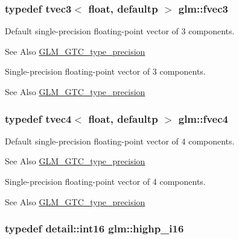 \hypertarget{group__gtc__type__precision_ga8480fdaa7fb8e177e57b367be79863d8}{
\subsubsection[{fvec3}]{\setlength{\rightskip}{0pt plus 5cm}typedef tvec3$<$ float, defaultp $>$ {\bf glm\-::fvec3}}}\label{group__gtc__type__precision_ga8480fdaa7fb8e177e57b367be79863d8}
Default single-\/precision floating-\/point vector of 3 components. \begin{DoxySeeAlso}{See Also}
\hyperlink{group__gtc__type__precision}{G\-L\-M\-\_\-\-G\-T\-C\-\_\-type\-\_\-precision}
\end{DoxySeeAlso}
Single-\/precision floating-\/point vector of 3 components. \begin{DoxySeeAlso}{See Also}
\hyperlink{group__gtc__type__precision}{G\-L\-M\-\_\-\-G\-T\-C\-\_\-type\-\_\-precision} 
\end{DoxySeeAlso}
\hypertarget{group__gtc__type__precision_ga396c4084cd7e5465f8b56035e0420c3e}{
\subsubsection[{fvec4}]{\setlength{\rightskip}{0pt plus 5cm}typedef tvec4$<$ float, defaultp $>$ {\bf glm\-::fvec4}}}\label{group__gtc__type__precision_ga396c4084cd7e5465f8b56035e0420c3e}
Default single-\/precision floating-\/point vector of 4 components. \begin{DoxySeeAlso}{See Also}
\hyperlink{group__gtc__type__precision}{G\-L\-M\-\_\-\-G\-T\-C\-\_\-type\-\_\-precision}
\end{DoxySeeAlso}
Single-\/precision floating-\/point vector of 4 components. \begin{DoxySeeAlso}{See Also}
\hyperlink{group__gtc__type__precision}{G\-L\-M\-\_\-\-G\-T\-C\-\_\-type\-\_\-precision} 
\end{DoxySeeAlso}
\hypertarget{group__gtc__type__precision_gaa04399853952dbce29cb62e2432f350a}{
\subsubsection[{highp\-\_\-i16}]{\setlength{\rightskip}{0pt plus 5cm}typedef detail\-::int16 {\bf glm\-::highp\-\_\-i16}}}\label{group__gtc__type__precision_gaa04399853952dbce29cb62e2432f350a}

